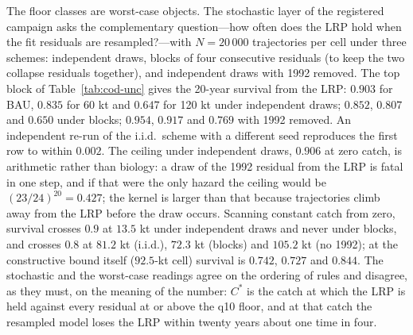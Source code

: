 \documentclass[11pt,a4paper]{article}
\theoremstyle{plain}
\theoremstyle{definition}
\theoremstyle{remark}
\newcommand{\Cstar}{C^{*}}
\begin{document}
The floor classes are worst-case objects. The stochastic layer of the registered campaign asks the complementary question---how often does the LRP hold when the fit residuals are resampled?---with $N=20\,000$ trajectories per cell under three schemes: independent draws, blocks of four consecutive residuals (to keep the two collapse residuals together), and independent draws with 1992 removed. The top block of Table~\ref{tab:cod-unc} gives the 20-year survival from the LRP: $0.903$ for BAU, $0.835$ for 60 kt and $0.647$ for 120 kt under independent draws; $0.852$, $0.807$ and $0.650$ under blocks; $0.954$, $0.917$ and $0.769$ with 1992 removed. An independent re-run of the i.i.d.\ scheme with a different seed reproduces the first row to within $0.002$. The ceiling under independent draws, $0.906$ at zero catch, is arithmetic rather than biology: a draw of the 1992 residual from the LRP is fatal in one step, and if that were the only hazard the ceiling would be $(23/24)^{20}=0.427$; the kernel is larger than that because trajectories climb away from the LRP before the draw occurs. Scanning constant catch from zero, survival crosses $0.9$ at $13.5$ kt under independent draws and never under blocks, and crosses $0.8$ at $81.2$ kt (i.i.d.), $72.3$ kt (blocks) and $105.2$ kt (no 1992); at the constructive bound itself ($92.5$-kt cell) survival is $0.742$, $0.727$ and $0.844$. The stochastic and the worst-case readings agree on the ordering of rules and disagree, as they must, on the meaning of the number: $\Cstar$ is the catch at which the LRP is held against every residual at or above the q10 floor, and at that catch the resampled model loses the LRP within twenty years about one time in four.
\end{document}
